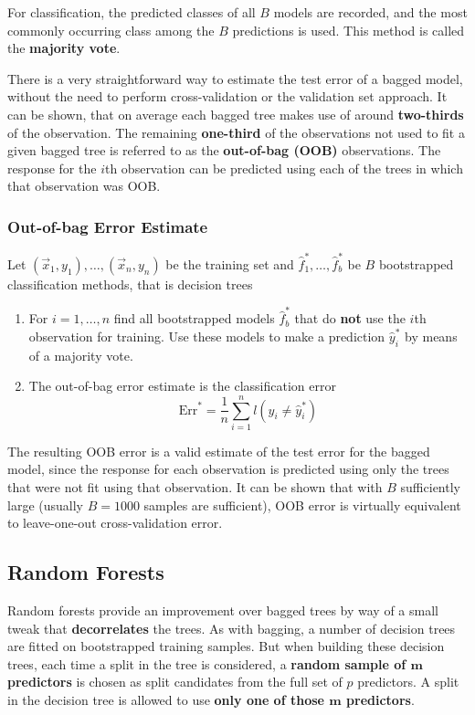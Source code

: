 \documentclass[11pt]{article}
\begin{document}
For classification, the predicted classes of all $B$ models are recorded, and the most commonly occurring class among the $B$ predictions is used. This method is called the \textbf{majority vote}.

There is a very straightforward way to estimate the test error of a bagged model, without the need to perform cross-validation or the validation set approach. It can be shown, that on average each bagged tree makes use of around \textbf{two-thirds} of the observation. The remaining \textbf{one-third} of the observations not used to fit a given bagged tree is referred to as the \textbf{out-of-bag (OOB)} observations. The response for the $i$th observation can be predicted using each of the trees in which that observation was OOB.

\newpage
\subsubsection{Out-of-bag Error Estimate}
\begin{definition}
	Let $(\vec{x}_1,y_1),\dots,(\vec{x}_n,y_n)$ be the training set and $\hat{f}_1^*,\dots,\hat{f}_b^*$ be $B$ bootstrapped classification methods, that is decision trees
	\begin{enumerate}
		\item For $i=1,\dots,n$ find all bootstrapped models $\hat{f}_b^*$ that do \textbf{not} use the $i$th observation for training. Use these models to make a prediction $\hat{y}_i^*$ by means of a majority vote.
		\item The out-of-bag error estimate is the classification error
		\begin{equation*}
			\text{Err}^* = \frac{1}{n}\sum_{i=1}^{n}l(y_i\neq \hat{y}_i^*)
		\end{equation*}
	\end{enumerate}
\end{definition}
The resulting OOB error is a valid estimate of the test error for the bagged model, since the response for each observation is predicted using only the trees that were not fit using that observation. It can be shown that with $B$ sufficiently large (usually $B=1000$ samples are sufficient), OOB error is virtually equivalent to leave-one-out cross-validation error.

\subsection{Random Forests}
Random forests provide an improvement over bagged trees by way of a small tweak that \textbf{decorrelates} the trees. As with bagging, a number of decision trees are fitted on bootstrapped training samples. But when building these decision trees, each time a split in the tree is considered, a \textbf{random sample of $\bm{m}$ predictors} is chosen as split candidates from the full set of $p$ predictors. A split in the decision tree is allowed to use \textbf{only one of those $\bm{m}$ predictors}.
\end{document}
